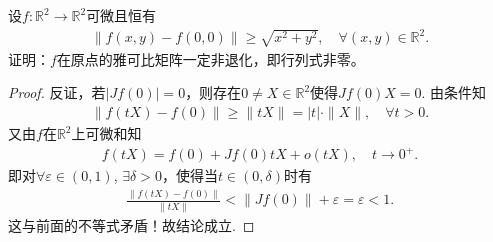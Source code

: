 \documentclass[../../main.tex]{subfiles}%
\begin{document}
\begin{example}
设$f: \mathbb{R}^2 \to \mathbb{R}^2$可微且恒有
\begin{align*}
\|f(x,y) - f(0,0)\| \geqslant \sqrt{x^2 + y^2}, \quad \forall (x,y) \in \mathbb{R}^2.
\end{align*}
证明：$f$在原点的雅可比矩阵一定非退化，即行列式非零。
\end{example}
\begin{proof}

反证，若$|Jf(0)| = 0$，则存在$0 \ne X \in \mathbb{R}^2$使得$Jf(0)X = 0$. 由条件知
\begin{align*}
\|f(tX) - f(0)\| \geqslant \|tX\| = |t| \cdot \|X\|, \quad \forall t > 0.
\end{align*}
又由$f$在$\mathbb{R}^2$上可微和知
\begin{align*}
f(tX) = f(0) + Jf(0)tX + o(tX), \quad t \to 0^+.
\end{align*}
即对$\forall \varepsilon \in (0,1)$, $\exists \delta > 0$，使得当$t \in (0,\delta)$时有
\begin{align*}
\frac{\|f(tX) - f(0)\|}{\|tX\|} < \|Jf(0)\| + \varepsilon = \varepsilon < 1.
\end{align*}
这与前面的不等式矛盾！故结论成立.
\end{proof}
\end{document}
